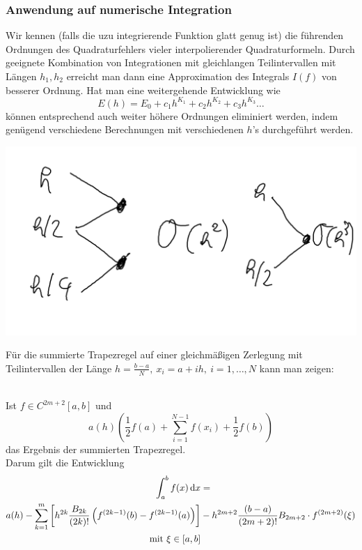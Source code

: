 \documentclass[../Skript.tex]{subfiles}
\begin{document}
{\subsubsection*{Anwendung auf numerische Integration}
Wir kennen (falls die uzu integrierende Funktion glatt genug ist) die 
führenden
Ordnungen des Quadraturfehlers vieler interpolierender Quadraturformeln. 
Durch 
geeignete Kombination von Integrationen mit gleichlangen Teilintervallen 
mit 
Längen $h_1, h_2$ erreicht man dann eine Approximation des Integrals 
$I(f)$ von 
besserer Ordnung. Hat man eine weitergehende Entwicklung wie \[
    E(h) = E_0 + c_1h^{K_1} + c_2 h^{K_2} + c_3h^{K_3}\dots\]
können entsprechend auch weiter höhere Ordnungen eliminiert werden, indem 
genügend verschiedene Berechnungen mit verschiedenen $h$'s durchgeführt 
werden. 
\begin{example}
    \hfill
    \begin{center}
        \includegraphics[width=\linewidth]{../Bilder/051222_1.png}
    \end{center}
\end{example}



Für die summierte Trapezregel auf einer gleichmäßigen Zerlegung mit 
Teilintervallen der Länge \(h=\frac{b-a}{N},\ x_i=a+ih,\ i=1,\dots,N\)
kann man zeigen:
\begin{theorem}\hfill\\
    Ist \(f\in C^{2m+2}[a,b]\) und \[
    a(h)\left(\frac{1}{2}f(a)+\sum^{N-1}_{i=1}f(x_i)+\frac{1}{2}f(b)
    \right)\]
    das Ergebnis der summierten Trapezregel.\\
    Darum gilt die Entwicklung
    \newpage
    \begin{align*}
        \int^b_af(x)\mathop{}\!\mathrm{d} x &= \\ 
        a(h)-\sum_{k=1}^m\left[h^{2k}\frac{B_{2k}}{(2k)!}\left(f^{(2k-
        1)}(b)-f^{(2k-1)}(a)\right)\right]&-h^{2m+2}\frac{(b-
        a)}{(2m+2)!}B_{2m+2}\cdot f^{(2m+2)}(\xi)\\
        \text{ mit } \xi\in[a,b]&\
    \end{align*}
    

\end{theorem}}
\end{document}
